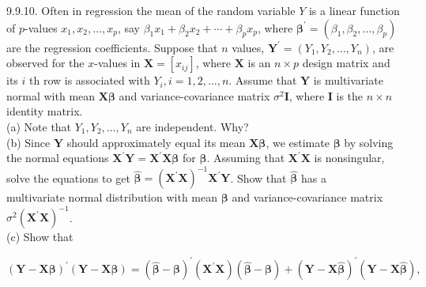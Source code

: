 9.9.10. Often in regression the mean of the random variable $Y$ is a linear function of $p$-values $x_{1}, x_{2}, \ldots, x_{p}$, say $\beta_{1} x_{1}+\beta_{2} x_{2}+\cdots+\beta_{p} x_{p}$, where $\boldsymbol{\beta}^{\prime}=\left(\beta_{1}, \beta_{2}, \ldots, \beta_{p}\right)$ are the regression coefficients. Suppose that $n$ values, $\boldsymbol{Y}^{\prime}=\left(Y_{1}, Y_{2}, \ldots, Y_{n}\right)$, are observed for the $x$-values in $\boldsymbol{X}=\left[x_{i j}\right]$, where $\boldsymbol{X}$ is an $n \times p$ design matrix and its $i$ th row is associated with $Y_{i}, i=1,2, \ldots, n$. Assume that $\boldsymbol{Y}$ is multivariate normal with mean $\boldsymbol{X} \boldsymbol{\beta}$ and variance-covariance matrix $\sigma^{2} \boldsymbol{I}$, where $\boldsymbol{I}$ is the $n \times n$ identity matrix.\\
(a) Note that $Y_{1}, Y_{2}, \ldots, Y_{n}$ are independent. Why?\\
(b) Since $\boldsymbol{Y}$ should approximately equal its mean $\boldsymbol{X} \boldsymbol{\beta}$, we estimate $\boldsymbol{\beta}$ by solving the normal equations $\boldsymbol{X}^{\prime} \boldsymbol{Y}=\boldsymbol{X}^{\prime} \boldsymbol{X} \boldsymbol{\beta}$ for $\boldsymbol{\beta}$. Assuming that $\boldsymbol{X}^{\prime} \boldsymbol{X}$ is nonsingular, solve the equations to get $\hat{\boldsymbol{\beta}}=\left(\boldsymbol{X}^{\prime} \boldsymbol{X}\right)^{-1} \boldsymbol{X}^{\prime} \boldsymbol{Y}$. Show that $\hat{\boldsymbol{\beta}}$ has a\\
multivariate normal distribution with mean $\boldsymbol{\beta}$ and variance-covariance matrix $\sigma^{2}\left(\boldsymbol{X}^{\prime} \boldsymbol{X}\right)^{-1}$.\\
(c) Show that

$$
(\boldsymbol{Y}-\boldsymbol{X} \boldsymbol{\beta})^{\prime}(\boldsymbol{Y}-\boldsymbol{X} \boldsymbol{\beta})=(\hat{\boldsymbol{\beta}}-\boldsymbol{\beta})^{\prime}\left(\boldsymbol{X}^{\prime} \boldsymbol{X}\right)(\hat{\boldsymbol{\beta}}-\boldsymbol{\beta})+(\boldsymbol{Y}-\boldsymbol{X} \hat{\boldsymbol{\beta}})^{\prime}(\boldsymbol{Y}-\boldsymbol{X} \hat{\boldsymbol{\beta}}),
$$

